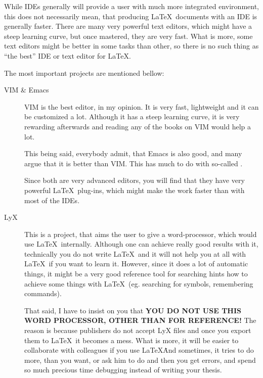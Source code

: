 While IDEs generally will provide a user with much more integrated environment,
this does not necessarily mean, that producing \LaTeX\ documents with an IDE is
generally faster. There are many very powerful text editors, which might have a
steep learning curve, but once mastered, they are very fast. What is more, some
text editors might be better in some tasks than other, so there is no such thing
as ``the best'' IDE or text editor for \LaTeX.

The most important projects are mentioned bellow:
\begin{description}
    \item[VIM \& Emacs] VIM is the best editor, in my opinion. It is very fast,
        lightweight and it can be customized a lot. Although it has a steep
        learning curve, it is very rewarding afterwards and reading any of the
        books on VIM would help a lot. 
        
        This being said, everybody admit, that Emacs is also good, and many
        argue that it is better than VIM. This has much to do with so-called
        .

        Since both are very advanced editors, you will find that they have very
        powerful \LaTeX\ plug-ins, which might make the work faster than with
        most of the IDEs.

    \item[LyX] This is a project, that aims the user to give a word-processor,
        which would use \LaTeX\ internally. Although one can achieve really good
        results with it, technically you do not write \LaTeX\ and it will not
        help you at all with \LaTeX\ if you want to learn it. However, since it
        does a lot of automatic things, it might be a very good reference tool
        for searching hints how to achieve some things with \LaTeX\ (eg.
        searching for symbols, remembering commands). 
        
        That said, I have to insist on you that {\bfseries YOU DO NOT USE THIS
        WORD PROCESSOR, OTHER THAN FOR REFERENCE!} The reason is because
        publishers do not accept LyX files and once you export them to \LaTeX\,
        it becomes a mess. What is more, it will be easier to collaborate with
        colleagues if you use \LaTeX\. And sometimes, it tries to do more, than
        you want, or ask him to do and then you get errors, and spend so much
        precious time debugging instead of writing your thesis.


\end{description}
